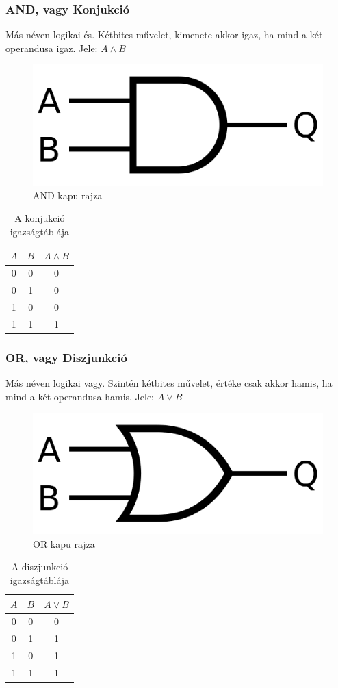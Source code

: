 \documentclass[
]{thesis-ekf}
\theoremstyle{definition}
\theoremstyle{remark}
\begin{document}
\subsubsection{AND, vagy Konjukció}
Más néven logikai és. Kétbites művelet, kimenete akkor igaz, ha mind a két operandusa igaz. Jele: $A \land B$

\begin{figure}[H]
	\centering
	\includegraphics[width=0.3\linewidth]{and}
	\caption{AND kapu rajza}
	\label{fig:and}
\end{figure}


\begin{table}[H]
	\centering
	\begin{tabular}{c|c|c}
		$A$ & $B$ & $A \land B$\\               
		\hline
		0 & 0 & 0\\
		0 & 1 & 0\\
		1 & 0 & 0\\
		1 & 1 & 1
	\end{tabular}
	\caption{A konjukció igazságtáblája}
\end{table}

\subsubsection{OR, vagy Diszjunkció}
Más néven logikai vagy. Szintén kétbites művelet, értéke csak akkor hamis, ha mind a két operandusa hamis. Jele: $A \lor B$

\begin{figure}[H]
	\centering
	\includegraphics[width=0.3\linewidth]{or}
	\caption{OR kapu rajza}
	\label{fig:or}
\end{figure}


\begin{table}[H]
	\centering
	\begin{tabular}{c|c|c}
		$A$ & $B$ & $A \lor B$\\               
		\hline
		0 & 0 & 0\\
		0 & 1 & 1\\
		1 & 0 & 1\\
		1 & 1 & 1
	\end{tabular}
	\caption{A diszjunkció igazságtáblája}
\end{table}
\end{document}
